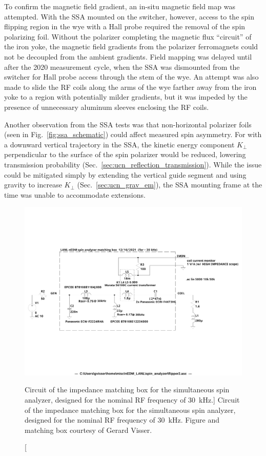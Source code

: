 To confirm the magnetic field gradient, an in-situ magnetic field map was attempted. With the SSA mounted on the switcher, however, access to the spin flipping region in the wye with a Hall probe required the removal of the spin polarizing foil. Without the polarizer completing the magnetic flux ``circuit'' of the iron yoke, the magnetic field gradients from the polarizer ferromagnets could not be decoupled from the ambient gradients. Field mapping was delayed until after the 2020 measurement cycle, when the SSA was dismounted from the switcher for Hall probe access through the stem of the wye. An attempt was also made to slide the RF coils along the arms of the wye farther away from the iron yoke to a region with potentially milder gradients, but it was impeded by the presence of unnecessary aluminum sleeves enclosing the RF coils.

Another observation from the SSA tests was that non-horizontal polarizer foils (seen in Fig.~\ref{fig:ssa_schematic}) could affect measured spin asymmetry. For \ucn with a downward vertical trajectory in the SSA, the kinetic energy component $K_\perp$ perpendicular to the surface of the spin polarizer would be reduced, lowering transmission probability (Sec.~\ref{sec:ucn_reflection_transmission}). While the issue could be mitigated simply by extending the vertical guide segment and using gravity to increase $K_\perp$ (Sec.~\ref{sec:ucn_grav_em}), the SSA mounting frame at the time was unable to accommodate extensions.

\begin{figure}[htp]
    \centering
    \includegraphics[width=\textwidth]{figures/matching_box_30kHz.pdf}
    \caption
    [Circuit of the impedance matching box for the simultaneous spin analyzer, designed for the nominal RF frequency of \qty{30}{kHz}.]
    {Circuit of the impedance matching box for the simultaneous spin analyzer, designed for the nominal RF frequency of \qty{30}{kHz}. Figure and matching box courtesy of Gerard Visser.}
    \label{fig:ssa_matching_box}
\end{figure}

